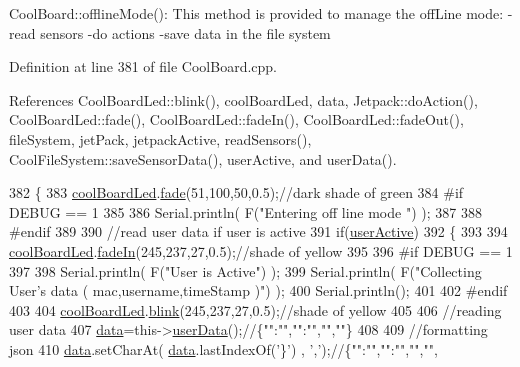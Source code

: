 Cool\+Board\+::offline\+Mode()\+: This method is provided to manage the off\+Line mode\+: -\/read sensors -\/do actions -\/save data in the file system 

Definition at line 381 of file Cool\+Board.\+cpp.



References Cool\+Board\+Led\+::blink(), cool\+Board\+Led, data, Jetpack\+::do\+Action(), Cool\+Board\+Led\+::fade(), Cool\+Board\+Led\+::fade\+In(), Cool\+Board\+Led\+::fade\+Out(), file\+System, jet\+Pack, jetpack\+Active, read\+Sensors(), Cool\+File\+System\+::save\+Sensor\+Data(), user\+Active, and user\+Data().


\begin{DoxyCode}
382 \{
383     \hyperlink{classCoolBoard_a1b1d3c684a5baa56b08486e192fd8e97}{coolBoardLed}.\hyperlink{classCoolBoardLed_af1cacbaa88db8bcf6042c1083ba41155}{fade}(51,100,50,0.5);\textcolor{comment}{//dark shade of green  }
384 \textcolor{preprocessor}{#if DEBUG == 1  }
385     
386     Serial.println( F(\textcolor{stringliteral}{"Entering off line mode "}) ); 
387     
388 \textcolor{preprocessor}{#endif}
389 
390     \textcolor{comment}{//read user data if user is active}
391     \textcolor{keywordflow}{if}(\hyperlink{classCoolBoard_a6395459131d6889a3005f79c7a35e964}{userActive})
392     \{
393 
394         \hyperlink{classCoolBoard_a1b1d3c684a5baa56b08486e192fd8e97}{coolBoardLed}.\hyperlink{classCoolBoardLed_ab778f5e7bed0ab74e3906d82110493c3}{fadeIn}(245,237,27,0.5);\textcolor{comment}{//shade of yellow}
395 
396 \textcolor{preprocessor}{    #if DEBUG == 1}
397         
398         Serial.println( F(\textcolor{stringliteral}{"User is Active"}) );
399         Serial.println( F(\textcolor{stringliteral}{"Collecting User's data ( mac,username,timeStamp )"}) );
400         Serial.println();
401 
402 \textcolor{preprocessor}{    #endif}
403 
404         \hyperlink{classCoolBoard_a1b1d3c684a5baa56b08486e192fd8e97}{coolBoardLed}.\hyperlink{classCoolBoardLed_a96e1ea13003eee34c9dbcef340404426}{blink}(245,237,27,0.5);\textcolor{comment}{//shade of yellow   }
405 
406         \textcolor{comment}{//reading user data}
407         \hyperlink{classCoolBoard_a427fb753dd8575bdf821c70a5c63d695}{data}=this->\hyperlink{classCoolBoard_ae7358fb6e623cfc81b775f5f1734909b}{userData}();\textcolor{comment}{//\{"":"","":"","",""\}}
408 
409         \textcolor{comment}{//formatting json }
410         \hyperlink{classCoolBoard_a427fb753dd8575bdf821c70a5c63d695}{data}.setCharAt( \hyperlink{classCoolBoard_a427fb753dd8575bdf821c70a5c63d695}{data}.lastIndexOf(\textcolor{charliteral}{'\}'}) , \textcolor{charliteral}{','});\textcolor{comment}{//\{"":"","":"","","",}

\end{DoxyCode}
